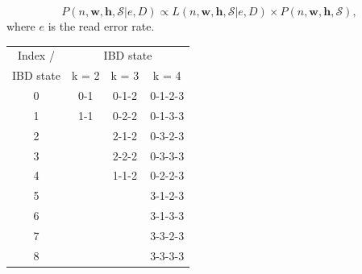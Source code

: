 \documentclass[9pt]{article}
\begin{document}
\begin{equation}
P(n, \mathbf{w}, \mathbf{h}, \mathcal{S}| e, D) \propto L(n, \mathbf{w}, \mathbf{h}, \mathcal{S} | e, D) \times P(n, \mathbf{w}, \mathbf{h}, \mathcal{S}), \label{eqn:post}
\end{equation}
where $e$ is the read error rate.

\begin{table}
\centering
\begin{tabular}{c|ccc}
  Index / & \multicolumn{3}{c}{IBD state} \\
IBD state    & k = 2& k = 3 & k = 4 \\ \hline
0   &0-1  & 0-1-2 & 0-1-2-3\\
1	  &1-1	&	0-2-2	& 0-1-3-3	\\
2	  &   	&	2-1-2	&0-3-2-3	\\
3	  &	  	&	2-2-2	&0-3-3-3	\\
4	  &		  &	1-1-2	&0-2-2-3	\\
5	  &		  &	    	&3-1-2-3	\\
6	  &	  	&		    &3-1-3-3	\\
7	  &	  	&		    &3-3-2-3	\\
8	  &	  	&	    	&3-3-3-3	\\

\end{tabular}
\end{table}
\end{document}
